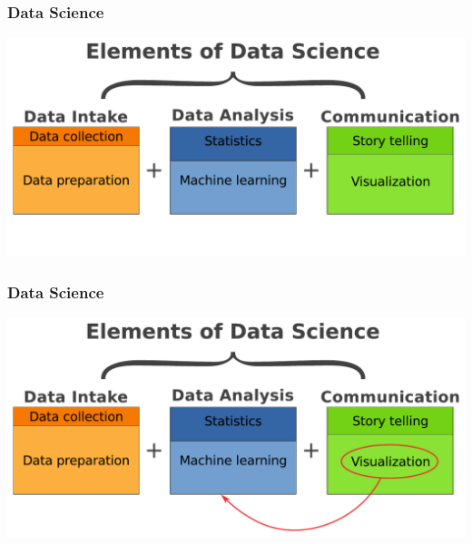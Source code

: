 
\begin{frame}
\frametitle{Data Science}

\begin{center}

\includegraphics[width=1\textwidth]{graphics/components.pdf}


\end{center}

\end{frame}


\begin{frame}
\frametitle{Data Science}
\setcounter{framenumber}{9}
\begin{center}

\includegraphics[width=1\textwidth]{graphics/components-b.pdf}


\end{center}

\end{frame}

